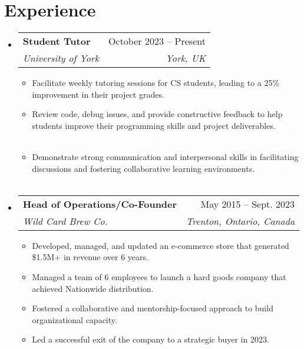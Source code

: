 \documentclass[letterpaper,11pt]{article}
\makeatletter
\newcommand{\resumeItem}[1]{
  \item\small{
    {#1 \vspace{-2pt}}
  }
}
\newcommand{\resumeSubheading}[4]{
  \vspace{-2pt}\item
    \begin{tabular*}{0.97\textwidth}[t]{l@{\extracolsep{\fill}}r}
      \textbf{#1} & #2 \\
      \textit{\small#3} & \textit{\small #4} \\
    \end{tabular*}\vspace{-7pt}
}
\newcommand{\resumeSubSubheading}[2]{
    \item
    \begin{tabular*}{0.97\textwidth}{l@{\extracolsep{\fill}}r}
      \textit{\small#1} & \textit{\small #2} \\
    \end{tabular*}\vspace{-7pt}
}
\newcommand{\resumeSubHeadingListStart}{\begin{itemize}[leftmargin=0.15in, label={}]}
\newcommand{\resumeSubHeadingListEnd}{\end{itemize}}
\newcommand{\resumeItemListStart}{\begin{itemize}}
\newcommand{\resumeItemListEnd}{\end{itemize}\vspace{-5pt}}
\makeatother
\begin{document}

\section{Experience}
  \resumeSubHeadingListStart

    \resumeSubheading
      {Student Tutor}{October 2023 -- Present}
      {University of York}{York, UK}
      \resumeItemListStart
      \resumeItem{Facilitate weekly tutoring sessions for CS students, leading to a 25\% improvement in their project grades.}
      \resumeItem{Review code, debug issues, and provide constructive feedback to help students improve their programming skills and project deliverables.
      \small{
    \textcolor{white}{back-end, full-stack, Web Development, node js, react js, pytorch
      }\\
      }}
      \resumeItem{Demonstrate strong communication and interpersonal skills in facilitating discussions and fostering collaborative learning environments.
          \small{
        \textcolor{white}{Software Testing, database design, API testing, SDLC, full stack, tdd, Webpack
          }\\
          }}
    \resumeItemListEnd
      

    \resumeSubheading
      {Head of Operations/Co-Founder}{May 2015 -- Sept. 2023}
      {Wild Card Brew Co.}{Trenton, Ontario, Canada}
      \resumeItemListStart
      \resumeItem{Developed, managed, and updated an e-commerce store that generated \$1.5M+ in revenue over 6 years.}
      \resumeItem{Managed a team of 6 employees to launch a hard goods company that achieved Nationwide distribution.}
      \resumeItem{Fostered a collaborative and mentorship-focused approach to build organizational capacity.}
      \resumeItem{Led a successful exit of the company to a strategic buyer in 2023.}
      \resumeItemListEnd
      
      \resumeSubHeadingListEnd
\end{document}
